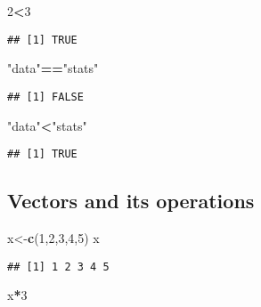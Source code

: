 \documentclass[
]{article}
\newenvironment{Shaded}{\begin{snugshade}}{\end{snugshade}}
\newcommand{\DecValTok}[1]{\textcolor[rgb]{0.00,0.00,0.81}{#1}}
\newcommand{\FunctionTok}[1]{\textcolor[rgb]{0.13,0.29,0.53}{\textbf{#1}}}
\newcommand{\NormalTok}[1]{#1}
\newcommand{\OtherTok}[1]{\textcolor[rgb]{0.56,0.35,0.01}{#1}}
\newcommand{\SpecialCharTok}[1]{\textcolor[rgb]{0.81,0.36,0.00}{\textbf{#1}}}
\newcommand{\StringTok}[1]{\textcolor[rgb]{0.31,0.60,0.02}{#1}}
\begin{document}
\begin{Shaded}
\begin{Highlighting}[]
\DecValTok{2}\SpecialCharTok{\textless{}}\DecValTok{3}
\end{Highlighting}
\end{Shaded}

\begin{verbatim}
## [1] TRUE
\end{verbatim}

\begin{Shaded}
\begin{Highlighting}[]
\StringTok{"data"}\SpecialCharTok{==}\StringTok{"stats"}
\end{Highlighting}
\end{Shaded}

\begin{verbatim}
## [1] FALSE
\end{verbatim}

\begin{Shaded}
\begin{Highlighting}[]
\StringTok{"data"}\SpecialCharTok{\textless{}}\StringTok{"stats"}
\end{Highlighting}
\end{Shaded}

\begin{verbatim}
## [1] TRUE
\end{verbatim}

\subsection{Vectors and its
operations}\label{vectors-and-its-operations}

\begin{Shaded}
\begin{Highlighting}[]
\NormalTok{x}\OtherTok{\textless{}{-}}\FunctionTok{c}\NormalTok{(}\DecValTok{1}\NormalTok{,}\DecValTok{2}\NormalTok{,}\DecValTok{3}\NormalTok{,}\DecValTok{4}\NormalTok{,}\DecValTok{5}\NormalTok{)}
\NormalTok{x}
\end{Highlighting}
\end{Shaded}

\begin{verbatim}
## [1] 1 2 3 4 5
\end{verbatim}

\begin{Shaded}
\begin{Highlighting}[]
\NormalTok{x}\SpecialCharTok{*}\DecValTok{3}
\end{Highlighting}
\end{Shaded}
\end{document}
